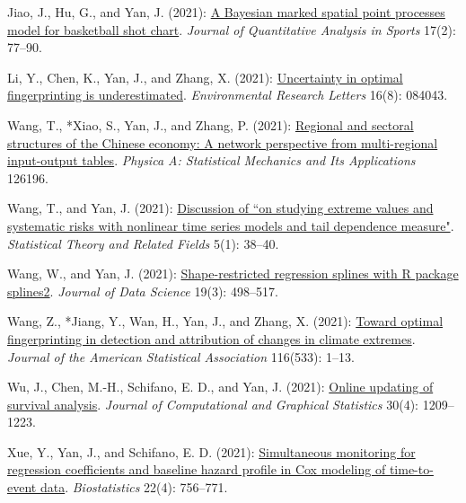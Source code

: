 \begin{RefereedJournalArticles}
\item *Jiao, J., Hu, G., and Yan, J. (2021):
\href{https://doi.org/10.1515/jqas-2019-0106}{A Bayesian marked spatial
point processes model for basketball shot chart}. \emph{Journal of
Quantitative Analysis in Sports} 17(2): 77--90.

\item *Li, Y., Chen, K., Yan, J., and Zhang, X. (2021):
\href{https://doi.org/10.1088/1748-9326/ac14ee}{Uncertainty in optimal
fingerprinting is underestimated}. \emph{Environmental Research Letters}
16(8): 084043.

\item Wang, T., *Xiao, S., Yan, J., and Zhang, P. (2021):
\href{https://doi.org/10.1016/j.physa.2021.126196}{Regional and sectoral
structures of the Chinese economy: A network perspective from
multi-regional input-output tables}. \emph{Physica A: Statistical
Mechanics and Its Applications} 126196.

\item *Wang, T., and Yan, J. (2021):
\href{https://doi.org/10.1080/24754269.2020.1869897}{Discussion of ``on
studying extreme values and systematic risks with nonlinear time series
models and tail dependence measure"}. \emph{Statistical Theory and
Related Fields} 5(1): 38--40.

\item *Wang, W., and Yan, J. (2021):
\href{https://doi.org/10.6339/21-JDS1020}{Shape-restricted regression
splines with R package splines2}. \emph{Journal of Data Science} 19(3):
498--517.

\item *Wang, Z., *Jiang, Y., Wan, H., Yan, J., and
Zhang, X. (2021):
\href{https://doi.org/10.1080/01621459.2020.1730852}{Toward optimal
fingerprinting in detection and attribution of changes in climate
extremes}. \emph{Journal of the American Statistical Association}
116(533): 1--13.

\item *Wu, J., Chen, M.-H., Schifano, E. D., and Yan, J. (2021):
\href{https://doi.org/10.1080/10618600.2020.1870481}{Online updating of
survival analysis}. \emph{Journal of Computational and Graphical
Statistics} 30(4): 1209--1223.

\item *Xue, Y., Yan, J., and Schifano, E. D. (2021):
\href{https://doi.org/10.1093/biostatistics/kxz064}{Simultaneous
monitoring for regression coefficients and baseline hazard profile in
Cox modeling of time-to-event data}. \emph{Biostatistics} 22(4):
756--771.


\end{RefereedJournalArticles}
